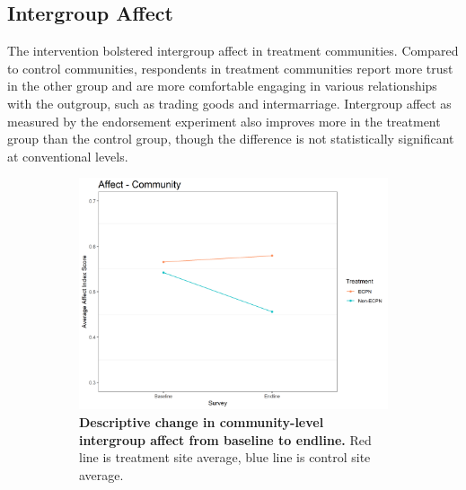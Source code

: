\documentclass[11pt]{article}
\begin{document}
\hypertarget{intergroup-affect}{%
\subsection{Intergroup Affect}\label{intergroup-affect}}

The intervention bolstered intergroup affect in treatment communities.
Compared to control communities, respondents in treatment communities
report more trust in the other group and are more comfortable engaging
in various relationships with the outgroup, such as trading goods and
intermarriage. Intergroup affect as measured by the endorsement
experiment also improves more in the treatment group than the control
group, though the difference is not statistically significant at
conventional levels.

\begin{figure}[H]
    \begin{subfigure}[b]{.48\textwidth}
    \centering
        \includegraphics[width=\linewidth]{../../../figs/affectComm_plot.png}
        \caption{\textbf{Descriptive change in community-level intergroup affect from baseline to endline.} Red line is treatment site average, blue line is control site average.}
        \label{fig:fig3}
    \end{subfigure}
    \hfill
    \begin{subfigure}[b]{.48\textwidth}
    \centering

\end{subfigure}
\end{figure}
\end{document}
